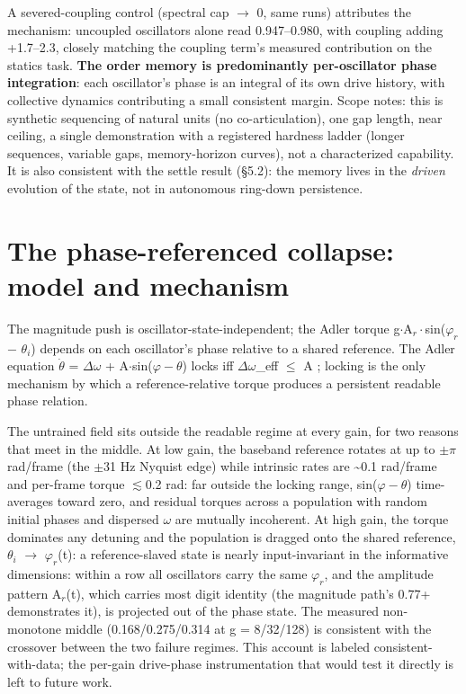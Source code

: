 \documentclass{article}
\makeatletter
\newcommand{\iclr@floatbarrier}{\par\vspace{\z@}%
  \ifx\@deferlist\@empty\else\clearpage\fi}
\let\iclr@section\section
\renewcommand{\section}{\iclr@floatbarrier\iclr@section}
\makeatother
\begin{document}
A severed-coupling control (spectral cap \ensuremath{\to} 0, same runs)
attributes the mechanism: uncoupled oscillators alone read 0.947--0.980,
with coupling adding +1.7--2.3, closely matching the coupling term's
measured contribution on the statics task. \textbf{The order memory is
predominantly per-oscillator phase integration}: each oscillator's phase
is an integral of its own drive history, with collective dynamics
contributing a small consistent margin. Scope notes: this is synthetic
sequencing of natural units (no co-articulation), one gap length, near
ceiling, a single demonstration with a registered hardness ladder
(longer sequences, variable gaps, memory-horizon curves), not a
characterized capability. It is also consistent with the settle result
(§5.2): the memory lives in the \emph{driven} evolution of the state,
not in autonomous ring-down persistence.

\section{The phase-referenced collapse: model and
mechanism}\label{the-phase-referenced-collapse-model-and-mechanism}

The magnitude push is oscillator-state-independent; the Adler torque
g\ensuremath{\cdot}A\ensuremath{_{r}\cdot}sin(\ensuremath{\varphi_{r}}
\ensuremath{-} \ensuremath{\theta_{i}}) depends on each oscillator's
phase relative to a shared reference. The Adler equation
\ensuremath{\dot{\theta}} = \ensuremath{\Delta\omega} +
A\ensuremath{\cdot}sin(\ensuremath{\varphi-\theta}) locks iff
\textbar{}\ensuremath{\Delta\omega}\_eff\textbar{} \ensuremath{\leq} A
\citep{adler1946}; locking is the only mechanism by which a
reference-relative torque produces a persistent readable phase relation.

The untrained field sits outside the readable regime at every gain, for
two reasons that meet in the middle. At low gain, the baseband reference
rotates at up to \ensuremath{\pm\pi} rad/frame (the \ensuremath{\pm}31
Hz Nyquist edge) while intrinsic rates are \textasciitilde0.1 rad/frame
and per-frame torque \ensuremath{\lesssim}0.2 rad: far outside the
locking range, sin(\ensuremath{\varphi-\theta}) time-averages toward
zero, and residual torques across a population with random initial
phases and dispersed \ensuremath{\omega} are mutually incoherent. At
high gain, the torque dominates any detuning and the population is
dragged onto the shared reference, \ensuremath{\theta_{i}}
\ensuremath{\to} \ensuremath{\varphi_{r}}(t): a reference-slaved state
is nearly input-invariant in the informative dimensions: within a row
all oscillators carry the same \ensuremath{\varphi_{r}}, and the
amplitude pattern A\ensuremath{_{r}}(t), which carries most digit
identity (the magnitude path's 0.77+ demonstrates it), is projected out
of the phase state. The measured non-monotone middle (0.168/0.275/0.314
at g = 8/32/128) is consistent with the crossover between the two
failure regimes. This account is labeled consistent-with-data; the
per-gain drive-phase instrumentation that would test it directly is left
to future work.
\end{document}
